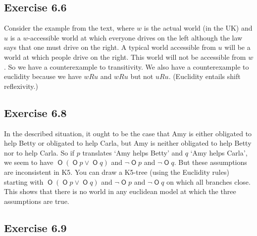 \documentclass{scrartcl}
\DeclareMathOperator{\Ob}{\mathsf{O}}
\begin{document}
  \subsection*{Exercise 6.6}

%
%
  Consider the example from the text, where $w$ is the actual world (in the UK)
  and $u$ is a $w$-accessible world at which everyone drives on the left
  although the law says that one must drive on the right. A typical world
  accessible from $u$ will be a world at which people drive on the right. This
  world will not be accessible from $w$. So we have a counterexample to
  transitivity. We also have a counterexample to euclidity because we have $wRu$
  and $wRu$ but not $uRu$. (Euclidity entails shift reflexivity.)

  \subsection*{Exercise 6.8}

%
%
  In the described situation, it ought to be the case that Amy is either
  obligated to help Betty or obligated to help Carla, but Amy is neither
  obligated to help Betty nor to help Carla. So if $p$ translates `Amy helps
  Betty' and $q$ `Amy helps Carla', we seem to have $\Ob(\Ob p \lor \Ob q)$ and
  $\neg \Ob p$ and $\neg \Ob q$. But these assumptions are inconsistent in K5.
  You can draw a K5-tree (using the Euclidity rules) starting with
  $\Ob(\Ob p \lor \Ob q)$ and $\neg \Ob p$ and $\neg \Ob q$ on which all
  branches close. This shows that there is no world in any euclidean model at
  which the three assumptions are true.

  \subsection*{Exercise 6.9}
\end{document}
